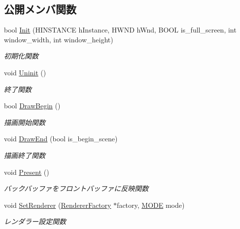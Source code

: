 \subsection*{公開メンバ関数}
\begin{DoxyCompactItemize}
\item 
bool \mbox{\hyperlink{class_renderer_a8d576add80187f5be3f24ec6a8108100}{Init}} (H\+I\+N\+S\+T\+A\+N\+CE h\+Instance, H\+W\+ND h\+Wnd, B\+O\+OL is\+\_\+full\+\_\+screen, int window\+\_\+width, int window\+\_\+height)
\begin{DoxyCompactList}\small\item\em 初期化関数 \end{DoxyCompactList}\item 
void \mbox{\hyperlink{class_renderer_ae865246d6a04d467ac22458f6f5f69d4}{Uninit}} ()
\begin{DoxyCompactList}\small\item\em 終了関数 \end{DoxyCompactList}\item 
bool \mbox{\hyperlink{class_renderer_af420951c9c163f1151bd6600df204cee}{Draw\+Begin}} ()
\begin{DoxyCompactList}\small\item\em 描画開始関数 \end{DoxyCompactList}\item 
void \mbox{\hyperlink{class_renderer_a0393849bd4178a33861780bf07b0deee}{Draw\+End}} (bool is\+\_\+begin\+\_\+scene)
\begin{DoxyCompactList}\small\item\em 描画終了関数 \end{DoxyCompactList}\item 
void \mbox{\hyperlink{class_renderer_a1dac4baae1fa79166442b0778a9c8728}{Present}} ()
\begin{DoxyCompactList}\small\item\em バックバッファをフロントバッファに反映関数 \end{DoxyCompactList}\item 
void \mbox{\hyperlink{class_renderer_a249147991a8187a3d373fd6bd43e8c54}{Set\+Renderer}} (\mbox{\hyperlink{class_renderer_factory}{Renderer\+Factory}} $\ast$factory, \mbox{\hyperlink{class_renderer_ab5a9379ccadcf2b3394c61cf8c835fec}{M\+O\+DE}} mode)
\begin{DoxyCompactList}\small\item\em レンダラー設定関数 \end{DoxyCompactList}\item 

\end{DoxyCompactItemize}
